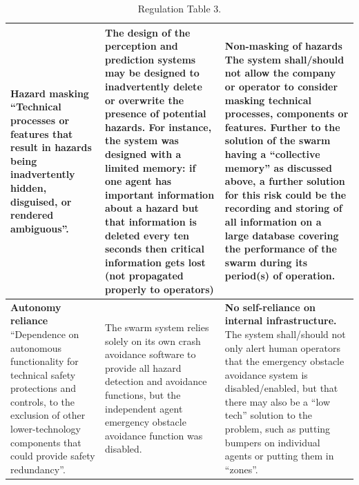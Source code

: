 \documentclass[lettersize,journal]{IEEEtran}
\begin{document}
\begin{landscape}
\begin{table}[]
\begin{tabular}{|p{0.3\textheight}|p{0.35\textheight}|p{0.35\textheight}|}
        \textbf{Hazard masking} ``Technical processes or features that result in hazards being inadvertently hidden, disguised, or rendered ambiguous”. \cite{macrae2021learning} & The design of the perception and prediction systems may be designed to inadvertently delete or overwrite the presence of potential hazards. For instance, the system was designed with a limited memory: if one agent has important information about a hazard but that information is deleted every ten seconds then critical information gets lost (not propagated properly to operators) & \textbf{Non-masking of hazards} The system shall/should not allow the company or operator to consider masking technical processes, components or features. Further to the solution of the swarm having a ``collective memory” \cite{wilson2022information} as discussed above, a further solution for this risk could be the recording and storing of all information on a large database covering the performance of the swarm during its period(s) of operation.\\
        \hline
        \textbf{Autonomy reliance } ``Dependence on autonomous functionality for technical safety protections and controls, to the exclusion of other lower-technology components that could provide safety redundancy”. \cite{macrae2021learning} & The swarm system relies solely on its own crash avoidance software to provide all hazard detection and avoidance functions, but the independent agent emergency obstacle avoidance function was disabled. &	\textbf{No self-reliance on internal infrastructure.} The system shall/should not only alert human operators that the emergency obstacle avoidance system is disabled/enabled, but that there may also be a ``low tech” solution to the problem, such as putting bumpers on individual agents or putting them in ``zones”.\\
        \hline
    \end{tabular}
    \caption{Regulation Table 3.}
    \label{tab:reg_3}
\end{table}
\end{landscape}
\end{document}
